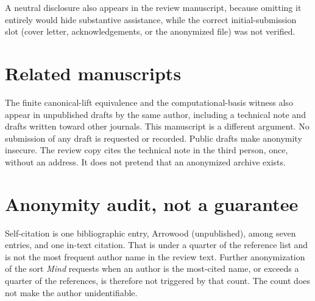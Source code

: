 \documentclass[12pt]{article}
\begin{document}
A neutral disclosure also appears in the review manuscript, because omitting it entirely would hide substantive assistance, while the correct initial-submission slot (cover letter, acknowledgements, or the anonymized file) was not verified.

\section*{Related manuscripts}
The finite canonical-lift equivalence and the computational-basis witness also appear in unpublished drafts by the same author, including a technical note and drafts written toward other journals. This manuscript is a different argument. No submission of any draft is requested or recorded. Public drafts make anonymity insecure. The review copy cites the technical note in the third person, once, without an address. It does not pretend that an anonymized archive exists.

\section*{Anonymity audit, not a guarantee}
Self-citation is one bibliographic entry, Arrowood (unpublished), among seven entries, and one in-text citation. That is under a quarter of the reference list and is not the most frequent author name in the review text. Further anonymization of the sort \emph{Mind} requests when an author is the most-cited name, or exceeds a quarter of the references, is therefore not triggered by that count. The count does not make the author unidentifiable.
\end{document}
